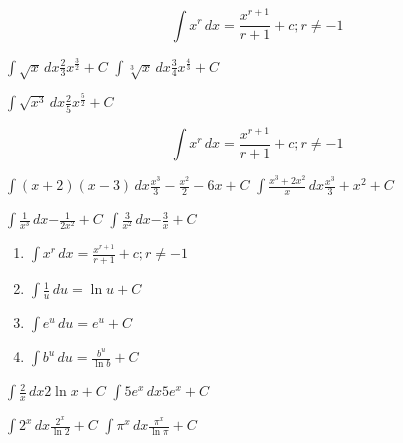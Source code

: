 
\newpage
\begin{myframe}[arc=10pt,auto outer arc]
	\[ \int x^r \,dx = \frac{x^{r+1}}{r + 1} + c; r\ne -1
	\]
\end{myframe}

\pairofprobsans
{$\displaystyle \int \sqrt{x} \,dx$}{$\displaystyle \frac{2}{3}x^{\frac{3}{2}}+ C$}%
{$\displaystyle \int \sqrt[3]{x} \,dx$}{$\displaystyle \frac{3}{4} x^{\frac{4}{3}} + C$}%

\problemans%
{$\displaystyle \int \sqrt{x^3} \,dx$}{$\displaystyle \frac{2}{5} x^{\frac{5}{2}} + C$}%



\newpage
\begin{myframe}[arc=10pt,auto outer arc]
	\[ \int x^r \,dx = \frac{x^{r+1}}{r + 1} + c; r\ne -1
	\]
\end{myframe}

\pairofprobsans%
{$\displaystyle \int (x+2)(x-3) \,dx$}{$\displaystyle \frac{x^3}{3} - \frac{x^2}{2} -6x + C$}%
{$\displaystyle \int \frac{x^3 + 2x^2}{x} \,dx$}{$\displaystyle \frac{x^3}{3} + x^2 + C$}%

\pairofprobsans%
{$\displaystyle \int \frac{1}{x^3}  \,dx$}{$\displaystyle -\frac{1}{2x^2} + C$}%
{$\displaystyle \int \frac{3}{x^2} \,dx$}{$\displaystyle -\frac{3}{x} + C$}%



\newpage
\begin{myframe}[arc=10pt,auto outer arc]
	\begin{enumerate}
	\item $\displaystyle \int x^r \,dx = \frac{x^{r+1}}{r + 1} + c; r\ne -1$
	\item $\displaystyle \int \frac{1}{u} \, du = \ln{u} + C$
	\item $\displaystyle \int e^u \, du = e^u + C$
	\item $\displaystyle \int b^u \, du = \frac{b^u}{\ln{b}} + C$
	\end{enumerate}
\end{myframe}

\pairofprobsans%
{$\displaystyle \int \frac{2}{x} \,dx$}{$\displaystyle 2\ln{x} + C$}%
{$\displaystyle \int 5e^x \,dx$}{$\displaystyle 5e^x + C$}%

\pairofprobsans%
{$\displaystyle \int 2^x \,dx$}{$\displaystyle \frac{2^x}{\ln{2}} + C$}%
{$\displaystyle \int \pi^x \,dx$}{$\displaystyle \frac{\pi^x}{\ln{\pi}} + C$}%

